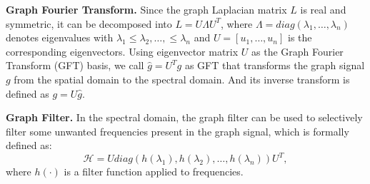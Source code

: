 \textbf{Graph Fourier Transform.}
Since the graph Laplacian matrix $L$ is real and symmetric, it can be decomposed into $L=U\Lambda U^T$, where $\Lambda=diag(\lambda_1, \ldots, \lambda_n) $ denotes eigenvalues with $\lambda_1 \leq \lambda_2, \ldots, \leq \lambda_n$ and $U=[u_1, \ldots, u_n]$ is the corresponding eigenvectors. Using eigenvector matrix $U$ as the Graph Fourier Transform (GFT) basis, we call $\hat{g}=U^Tg$ as GFT that transforms the graph signal $g$ from the spatial domain to the spectral domain. And its inverse transform is defined as $g = U\hat{g}$. 




\textbf{Graph Filter.}
In the spectral domain, the graph filter can be used to selectively filter some unwanted frequencies present in the graph signal, which is formally defined as:
\begin{equation}\label{eq:filter}
\mathcal{H}=Udiag(h(\lambda_1),h(\lambda_2), \ldots, h(\lambda_n))U^T,
\end{equation}
where $h(\cdot)$ is a filter function applied to frequencies.




